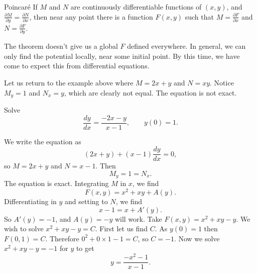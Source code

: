 \documentclass{ximera}
\begin{document}
\begin{theorem}{Poincar\'e}
    If $M$ and $N$ are continuously differentiable functions of $(x,y)$, and $\frac{\partial M}{\partial y} = \frac{\partial N}{\partial x}$, then near any point there is a function $F(x,y)$ such that $M = \frac{\partial F}{\partial x}$ and $N = \frac{\partial F}{\partial y}$.
\end{theorem}

The theorem doesn't give us a global $F$ defined everywhere.  In general, we can only find the potential locally, near some initial point. By this time, we have come to expect this from differential equations.

Let us return to the example above where $M = 2x + y$ and $N = xy$. Notice 
$M_y = 1$ and  $N_x = y$, which are clearly not equal.  The equation is not exact.

\begin{example}
    Solve
    \begin{equation*}
        \frac{dy}{dx} = \frac{-2x-y}{x-1}, \qquad y(0) = 1.
    \end{equation*}
\end{example}

\begin{exampleSol}
    We write the equation as
    \begin{equation*}
        (2x+y) + (x-1)\frac{dy}{dx} = 0 ,
    \end{equation*}
    so $M = 2x+y$ and $N = x-1$.  Then
    \begin{equation*}
        M_y = 1 = N_x .
    \end{equation*}
    The equation is exact.
    Integrating $M$ in $x$, we find
    \begin{equation*}
        F(x,y) = x^2+xy + A(y) .
    \end{equation*}
    Differentiating in $y$ and setting to $N$, we find
    \begin{equation*}
        x-1 = x + A'(y) .
    \end{equation*}
        So $A'(y) = -1$, and $A(y) = -y$ will work.  Take $F(x,y) = x^2+xy-y$.  We wish to solve $x^2+xy-y = C$.  First let us find $C$.  As $y(0)=1$ then $F(0,1) = C$.  Therefore $0^2+0\times 1 - 1 = C$, so $C=-1$.  Now we solve $x^2+xy-y = -1$ for $y$ to get
    \begin{equation*}
        y = \frac{-x^2-1}{x-1} .
    \end{equation*}
\end{exampleSol}
\end{document}
